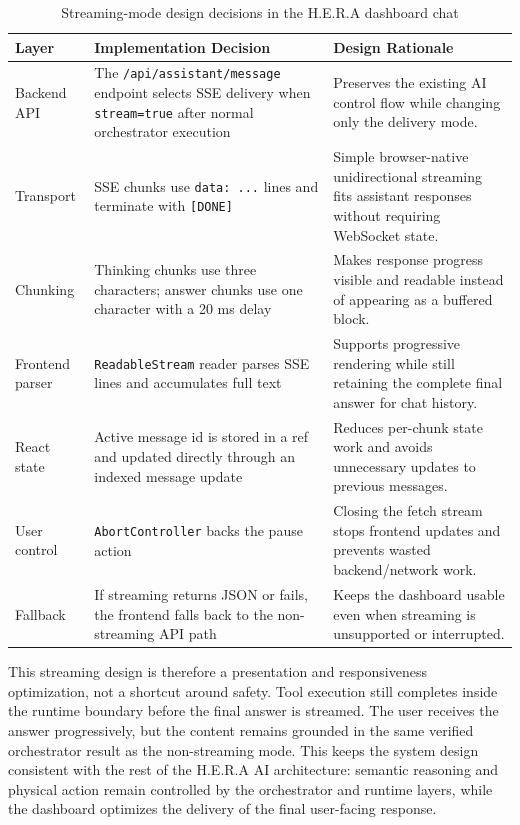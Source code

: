 \begin{table}[H]
    \centering
    \caption{Streaming-mode design decisions in the H.E.R.A dashboard chat}
    \label{tab:hera-streaming-design}
    \small
    \renewcommand{\arraystretch}{1.15}
    \begin{tabularx}{\textwidth}{@{}p{2.7cm}X X@{}}
        \toprule
        \textbf{Layer} & \textbf{Implementation Decision} & \textbf{Design Rationale} \\
        \midrule
        Backend API & The \texttt{/api/assistant/message} endpoint selects SSE delivery when \texttt{stream=true} after normal orchestrator execution & Preserves the existing AI control flow while changing only the delivery mode. \\
        Transport & SSE chunks use \texttt{data: ...} lines and terminate with \texttt{[DONE]} & Simple browser-native unidirectional streaming fits assistant responses without requiring WebSocket state. \\
        Chunking & Thinking chunks use three characters; answer chunks use one character with a 20 ms delay & Makes response progress visible and readable instead of appearing as a buffered block. \\
        Frontend parser & \texttt{ReadableStream} reader parses SSE lines and accumulates full text & Supports progressive rendering while still retaining the complete final answer for chat history. \\
        React state & Active message id is stored in a ref and updated directly through an indexed message update & Reduces per-chunk state work and avoids unnecessary updates to previous messages. \\
        User control & \texttt{AbortController} backs the pause action & Closing the fetch stream stops frontend updates and prevents wasted backend/network work. \\
        Fallback & If streaming returns JSON or fails, the frontend falls back to the non-streaming API path & Keeps the dashboard usable even when streaming is unsupported or interrupted. \\
        \bottomrule
    \end{tabularx}
\end{table}

This streaming design is therefore a presentation and responsiveness optimization, not a shortcut around safety. Tool execution still completes inside the runtime boundary before the final answer is streamed. The user receives the answer progressively, but the content remains grounded in the same verified orchestrator result as the non-streaming mode. This keeps the system design consistent with the rest of the H.E.R.A AI architecture: semantic reasoning and physical action remain controlled by the orchestrator and runtime layers, while the dashboard optimizes the delivery of the final user-facing response.

